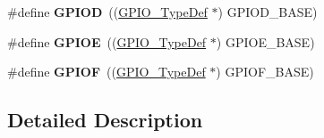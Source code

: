 \begin{DoxyCompactItemize}
\#define {\bfseries G\+P\+I\+OD}~((\hyperlink{struct_g_p_i_o___type_def}{G\+P\+I\+O\+\_\+\+Type\+Def} $\ast$) G\+P\+I\+O\+D\+\_\+\+B\+A\+SE)
\item 
\mbox{\label{group___peripheral__declaration_gae04bdb5e8acc47cab1d0532e6b0d0763}} 
\#define {\bfseries G\+P\+I\+OE}~((\hyperlink{struct_g_p_i_o___type_def}{G\+P\+I\+O\+\_\+\+Type\+Def} $\ast$) G\+P\+I\+O\+E\+\_\+\+B\+A\+SE)
\item 
\mbox{\label{group___peripheral__declaration_ga43c3022dede7c9db7a58d3c3409dbc8d}} 
\#define {\bfseries G\+P\+I\+OF}~((\hyperlink{struct_g_p_i_o___type_def}{G\+P\+I\+O\+\_\+\+Type\+Def} $\ast$) G\+P\+I\+O\+F\+\_\+\+B\+A\+SE)
\end{DoxyCompactItemize}


\subsection{Detailed Description}
